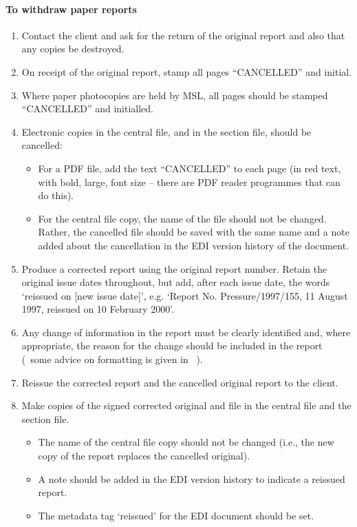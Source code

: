 \paragraph{To withdraw paper reports}
\begin{enumerate}
\item Contact the client and ask for the return of the original report and also that any copies be destroyed. 

\item On receipt of the original report, stamp all pages ``{\color{red}CANCELLED}” and initial. 

\item Where paper photocopies are held by MSL, all pages should be stamped ``{\color{red}CANCELLED}” and initialled.

\item Electronic copies in the central file, and in the section file, should be cancelled:
\begin{itemize}
\item For a PDF file, add the text “{\color{red}CANCELLED}” to each page (in red text, with bold, large, font size – there are PDF reader programmes that can do this). 
\item For the central file copy, the name of the file should not be changed. Rather, the cancelled file should be saved with the same name and a note added about the cancellation in the EDI version history of the document. 
\end{itemize}

\item Produce a corrected report using the original report number.  Retain the original issue dates throughout, but add, after each issue date, the words ‘reissued on [new issue date]’, e.g. ‘Report No. Pressure/1997/155, 11 August 1997, reissued on 10 February 2000’.

\item Any change of information in the report must be clearly identified and, where appropriate, the reason for the change should be included in the report (~some advice on formatting is given in \cite[\S\ref*{GRP-ss:reissued_reports}]{MSL_Reporting_Guidelines}~).

\item Reissue the corrected report and the cancelled original report to the client.

\item Make copies of the signed corrected original and file in the central file and the section file. 
\begin{itemize}
\item The name of the central file copy should not be changed (i.e., the new copy of the report replaces the cancelled original). 
\item A note should be added in the EDI version history to indicate a reissued report.
\item The metadata tag ‘reissued’ for the EDI document should be set.
\end{itemize}

\end{enumerate}

